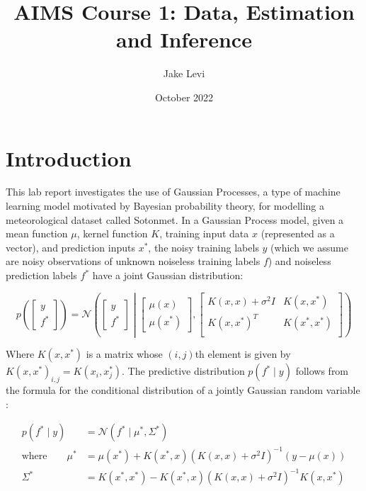 \documentclass{article}
\title{AIMS Course 1: Data, Estimation and Inference}
\author{Jake Levi}
\date{October 2022}
\begin{document}
\maketitle


\section{Introduction}

This lab report investigates the use of Gaussian Processes, a type of machine learning model motivated by Bayesian probability theory, for modelling a meteorological dataset called Sotonmet. In a Gaussian Process model, given a mean function $\mu$, kernel function $K$, training input data $x$ (represented as a vector), and prediction inputs $x^*$, the noisy training labels $y$ (which we assume are noisy observations of unknown noiseless training labels $f$) and noiseless prediction labels $f^*$ have a joint Gaussian distribution:


\begin{equation}
    p\left( \begin{bmatrix}
        y \\
        f^*
    \end{bmatrix} \right)
    = \mathcal{N} \left( \begin{bmatrix}
        y \\
        f^*
    \end{bmatrix} \middle| \begin{bmatrix}
        \mu(x) \\
        \mu(x^*)
    \end{bmatrix}, \begin{bmatrix}
        K(x, x) + \sigma^2 I & K(x, x^*) \\
        K(x, x^*)^T & K(x^*, x^*) \\
    \end{bmatrix} \right)
\end{equation}

Where $K(x, x^*)$ is a matrix whose $(i, j)$th element is given by $K(x, x^*)_{i,j} = K(x_i, x^*_j)$. The predictive distribution $p(f^* \mid y)$ follows from the formula for the conditional distribution of a jointly Gaussian random variable \cite{bishop2006pattern}:


\begin{align}
    p(f^* \mid y) &= \mathcal{N}\left(f^* \mid \mu^*, \Sigma^* \right) \\
    \text{where} \qquad \mu^* &= \mu(x^*) + K(x^*, x) \left( K(x, x) + \sigma^2 I \right)^{-1} (y - \mu(x)) \\
    \Sigma^* &= K(x^*, x^*) - K(x^*, x) \left( K(x, x) + \sigma^2 I \right) ^{-1} K(x, x^*)
\end{align}
\end{document}

